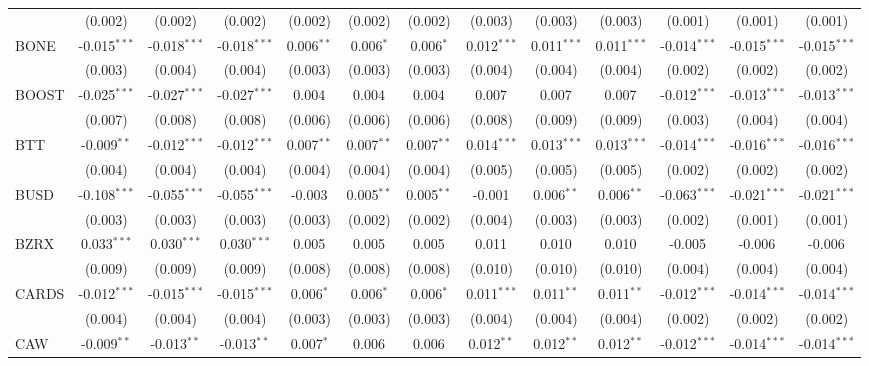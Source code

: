 \begin{table}[!htbp]
\begin{tabular}{@{\extracolsep{5pt}}lcccccccccccc}
  & (0.002) & (0.002) & (0.002) & (0.002) & (0.002) & (0.002) & (0.003) & (0.003) & (0.003) & (0.001) & (0.001) & (0.001) \\
 BONE & -0.015$^{***}$ & -0.018$^{***}$ & -0.018$^{***}$ & 0.006$^{**}$ & 0.006$^{*}$ & 0.006$^{*}$ & 0.012$^{***}$ & 0.011$^{***}$ & 0.011$^{***}$ & -0.014$^{***}$ & -0.015$^{***}$ & -0.015$^{***}$ \\
  & (0.003) & (0.004) & (0.004) & (0.003) & (0.003) & (0.003) & (0.004) & (0.004) & (0.004) & (0.002) & (0.002) & (0.002) \\
 BOOST & -0.025$^{***}$ & -0.027$^{***}$ & -0.027$^{***}$ & 0.004$^{}$ & 0.004$^{}$ & 0.004$^{}$ & 0.007$^{}$ & 0.007$^{}$ & 0.007$^{}$ & -0.012$^{***}$ & -0.013$^{***}$ & -0.013$^{***}$ \\
  & (0.007) & (0.008) & (0.008) & (0.006) & (0.006) & (0.006) & (0.008) & (0.009) & (0.009) & (0.003) & (0.004) & (0.004) \\
 BTT & -0.009$^{**}$ & -0.012$^{***}$ & -0.012$^{***}$ & 0.007$^{**}$ & 0.007$^{**}$ & 0.007$^{**}$ & 0.014$^{***}$ & 0.013$^{***}$ & 0.013$^{***}$ & -0.014$^{***}$ & -0.016$^{***}$ & -0.016$^{***}$ \\
  & (0.004) & (0.004) & (0.004) & (0.004) & (0.004) & (0.004) & (0.005) & (0.005) & (0.005) & (0.002) & (0.002) & (0.002) \\
 BUSD & -0.108$^{***}$ & -0.055$^{***}$ & -0.055$^{***}$ & -0.003$^{}$ & 0.005$^{**}$ & 0.005$^{**}$ & -0.001$^{}$ & 0.006$^{**}$ & 0.006$^{**}$ & -0.063$^{***}$ & -0.021$^{***}$ & -0.021$^{***}$ \\
  & (0.003) & (0.003) & (0.003) & (0.003) & (0.002) & (0.002) & (0.004) & (0.003) & (0.003) & (0.002) & (0.001) & (0.001) \\
 BZRX & 0.033$^{***}$ & 0.030$^{***}$ & 0.030$^{***}$ & 0.005$^{}$ & 0.005$^{}$ & 0.005$^{}$ & 0.011$^{}$ & 0.010$^{}$ & 0.010$^{}$ & -0.005$^{}$ & -0.006$^{}$ & -0.006$^{}$ \\
  & (0.009) & (0.009) & (0.009) & (0.008) & (0.008) & (0.008) & (0.010) & (0.010) & (0.010) & (0.004) & (0.004) & (0.004) \\
 CARDS & -0.012$^{***}$ & -0.015$^{***}$ & -0.015$^{***}$ & 0.006$^{*}$ & 0.006$^{*}$ & 0.006$^{*}$ & 0.011$^{***}$ & 0.011$^{**}$ & 0.011$^{**}$ & -0.012$^{***}$ & -0.014$^{***}$ & -0.014$^{***}$ \\
  & (0.004) & (0.004) & (0.004) & (0.003) & (0.003) & (0.003) & (0.004) & (0.004) & (0.004) & (0.002) & (0.002) & (0.002) \\
 CAW & -0.009$^{**}$ & -0.013$^{**}$ & -0.013$^{**}$ & 0.007$^{*}$ & 0.006$^{}$ & 0.006$^{}$ & 0.012$^{**}$ & 0.012$^{**}$ & 0.012$^{**}$ & -0.012$^{***}$ & -0.014$^{***}$ & -0.014$^{***}$ \\

\end{tabular}
\end{table}

